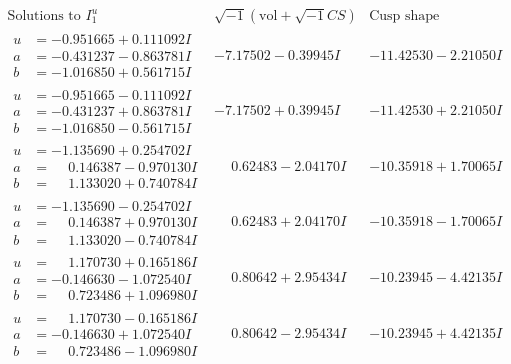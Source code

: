 \documentclass[1p]{elsarticle_modified}
\theoremstyle{definition}
\newcommand{\I}{\sqrt{-1}}
\begin{document}
$$\begin{array}{c|c|c}  
\text{Solutions to }I^u_{1}& \I (\text{vol} + \sqrt{-1}CS) & \text{Cusp shape}\\
 \hline 
\begin{aligned}
u &= -0.951665 + 0.111092 I \\
a &= -0.431237 - 0.863781 I \\
b &= -1.016850 + 0.561715 I\end{aligned}
 & -7.17502 - 0.39945 I & -11.42530 - 2.21050 I \\ \hline\begin{aligned}
u &= -0.951665 - 0.111092 I \\
a &= -0.431237 + 0.863781 I \\
b &= -1.016850 - 0.561715 I\end{aligned}
 & -7.17502 + 0.39945 I & -11.42530 + 2.21050 I \\ \hline\begin{aligned}
u &= -1.135690 + 0.254702 I \\
a &= \phantom{-}0.146387 - 0.970130 I \\
b &= \phantom{-}1.133020 + 0.740784 I\end{aligned}
 & \phantom{-}0.62483 - 2.04170 I & -10.35918 + 1.70065 I \\ \hline\begin{aligned}
u &= -1.135690 - 0.254702 I \\
a &= \phantom{-}0.146387 + 0.970130 I \\
b &= \phantom{-}1.133020 - 0.740784 I\end{aligned}
 & \phantom{-}0.62483 + 2.04170 I & -10.35918 - 1.70065 I \\ \hline\begin{aligned}
u &= \phantom{-}1.170730 + 0.165186 I \\
a &= -0.146630 - 1.072540 I \\
b &= \phantom{-}0.723486 + 1.096980 I\end{aligned}
 & \phantom{-}0.80642 + 2.95434 I & -10.23945 - 4.42135 I \\ \hline\begin{aligned}
u &= \phantom{-}1.170730 - 0.165186 I \\
a &= -0.146630 + 1.072540 I \\
b &= \phantom{-}0.723486 - 1.096980 I\end{aligned}
 & \phantom{-}0.80642 - 2.95434 I & -10.23945 + 4.42135 I \\ \hline\begin{aligned}

\end{aligned}
\end{array}$$
\end{document}
